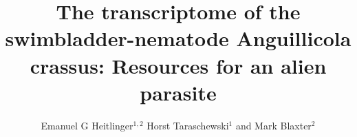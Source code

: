 \documentclass[10pt]{bmc_article}
\newenvironment{bmcformat}{\begin{raggedright}\baselineskip20pt\sloppy\setboolean{publ}{false}}{\end{raggedright}\baselineskip20pt\sloppy}
\begin{document}
\begin{bmcformat}



  \title{The transcriptome of the swimbladder-nematode
    Anguillicola crassus: Resources for an alien parasite}
 


\author{Emanuel G Heitlinger\correspondingauthor$^{1,2}$%
       Horst Taraschewski$^1$%
       and Mark Blaxter$^2$%
     }%
      


      \address{%
        \iid(1)Department of Ecology and Parasitology, Zoological
        Institute 1, University of Karlsruhe,%
        Kornblumenstrasse 13, Karlsruhe, Germany\\
        \iid(2)Institute of Evolutionary Biology, The Ashworth laboratories, The University of Edinburgh, King's Buildings Campus, Edinburgh, UK
      }%

\maketitle




\end{bmcformat}
\end{document}
